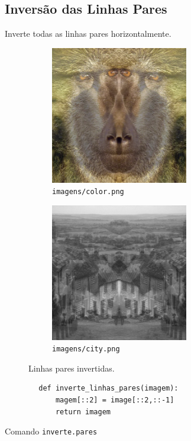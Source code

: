 \subsection{Inversão das Linhas Pares}

Inverte todas as linhas pares horizontalmente.

\begin{figure}[h]
    \centering
    \begin{subfigure}{0.45\textwidth}
        \centering
        \includegraphics[width=6cm]{resultados/colorinvp.png}
        \caption{\texttt{imagens/color.png}}
    \end{subfigure}%
    \begin{subfigure}{0.45\textwidth}
        \centering
        \includegraphics[width=6cm]{resultados/cityinvp.png}
        \caption{\texttt{imagens/city.png}}
    \end{subfigure}

    \caption{Linhas pares invertidas.}
\end{figure}

\begin{listing}[H]

    \begin{verbatim}
        def inverte_linhas_pares(imagem):
            magem[::2] = image[::2,::-1]
            return imagem
    \end{verbatim}

    \caption{Comando \texttt{inverte.pares}}
\end{listing}
